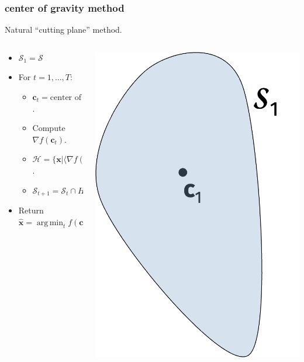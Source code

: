 \documentclass[compress]{beamer}
\newcommand{\bv}[1]{\mathbf{#1}}
\DeclareMathOperator*{\argmin}{arg\,min}
\begin{document}
\begin{frame}[t]
	\frametitle{center of gravity method}
	\begin{center}
	Natural ``cutting plane'' method.
	\end{center}
\begin{columns}
	\begin{column}{.6\textwidth}
		\begin{itemize}
			\item $\mathcal{S}_1 = \mathcal{S}$
			\item For $t = 1, \ldots, T:$
			\begin{itemize}
				\item \alert{$\bv{c}_t = \text{center of gravity of } \mathcal{S}_t$.}
				\item Compute $\nabla f(\bv{c}_t)$.
				\item $\mathcal{H} = \{\bv{x} \big\vert \langle \nabla f(\bv{c}_t), \bv{x}-\bv{c}_t\rangle \leq 0\}$.
				\item $\mathcal{S}_{t+1} = \mathcal{S}_{t} \cap H$
			\end{itemize}
			\item Return $\hat{\mathbf{x}} = \argmin_t f(\bv{c}_t)$
		\end{itemize}
	\end{column}
	\begin{column}{.35\textwidth}
	\includegraphics[width=\textwidth]{cog1.png}

\end{column}
\end{columns}
\end{frame}
\end{document}
